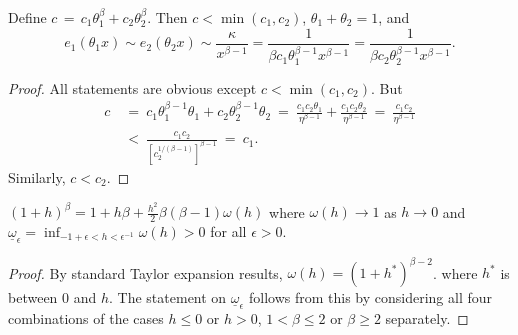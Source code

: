 \begin{lemma}\label{Lemma:9.11a} Define
$c\,=\, c_1\theta_1^\beta+c_2\theta_2^\beta$.
Then $c<\min(c_1,c_2)$, $\theta_1+\theta_2=1$, and
\begin{equation}\label{11.11b}
e_1(\theta_1 x) \sim e_2(\theta_2 x) \sim \frac{\kappa}{x^{\beta-1}} = \frac{1}{\beta c_1\theta_1^{\beta-1}x^{\beta-1}} = \frac{1}{\beta c_2\theta_2^{\beta-1}x^{\beta-1}}.
\end{equation}
\end{lemma}
\begin{proof} All statements are obvious except $c<\min(c_1,c_2)$. But
\begin{align}\label{SA4.2b}
c\ &=\ c_1\theta_1^{\beta-1}\theta_1+c_2\theta_2^{\beta-1}\theta_2
\ =\ \frac{c_1c_2\theta_1}{\eta^{\beta-1}}
+\frac{c_1c_2\theta_2}{\eta^{\beta-1}}\ =\ \frac{c_1c_2}{\eta^{\beta-1}}\\
\nonumber &<\ \frac{c_1c_2}{{[c_2^{1/(\beta-1)}]}^{\beta-1}}
\ =\ c_1.
\end{align}
Similarly, $c<c_2$.
\end{proof}

\begin{lemma}\label{Lemma:10.11a} $\displaystyle  (1+h)^\beta = 1+h\beta +\frac{h^2}{2}
\beta(\beta-1)\omega(h)$
where $\omega(h)\to 1$ as $h\to 0$ and
$\underline \omega_\epsilon=\inf_{-1+\epsilon<h<\epsilon^{-1}}\omega(h)>0$ for all $\epsilon>0$.
\end{lemma}
\begin{proof}  By standard Taylor expansion results, $\omega(h)=(1+h^*)^{\beta-2}$.
where $h^*$ is between $0$ and $h$. The statement on $\underline \omega_\epsilon$ follows from this by considering
all four combinations of the cases $h\le 0$ or $h>0$, $1<\beta\le 2$ or $\beta\ge 2$ separately.
\end{proof}


